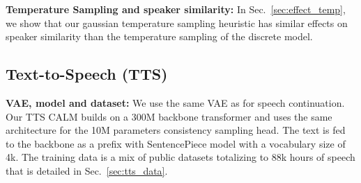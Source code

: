 \noindent\textbf{Temperature Sampling and speaker similarity:} In Sec.~\ref{sec:effect_temp}, we show that our gaussian temperature sampling heuristic has similar effects on speaker similarity than the temperature sampling of the discrete model.


\subsection{Text-to-Speech (TTS)}
\noindent\textbf{VAE, model and dataset:} We use the same VAE as for speech continuation. Our TTS CALM builds on a 300M backbone transformer and uses the same architecture for the 10M parameters consistency sampling head. The text is fed to the backbone as a prefix with SentencePiece model \citep{sentencepiece} with a vocabulary size of 4k. The training data is a mix of public datasets totalizing to 88k hours of speech that is detailed in Sec.~\ref{sec:tts_data}.


